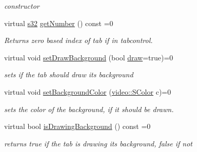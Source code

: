 \begin{DoxyCompactItemize}
\begin{DoxyCompactList}\small\item\em constructor \end{DoxyCompactList}\item 
virtual \hyperlink{namespaceirr_ac66849b7a6ed16e30ebede579f9b47c6}{s32} \hyperlink{classirr_1_1gui_1_1IGUITab_aedc76f9d93782188741ace78b32634f0}{get\+Number} () const =0
\begin{DoxyCompactList}\small\item\em Returns zero based index of tab if in tabcontrol. \end{DoxyCompactList}\item 
\mbox{\label{classirr_1_1gui_1_1IGUITab_a15aa82c853f4e72c1da37f556cd3b097}} 
virtual void \hyperlink{classirr_1_1gui_1_1IGUITab_a15aa82c853f4e72c1da37f556cd3b097}{set\+Draw\+Background} (bool \hyperlink{classirr_1_1gui_1_1IGUIElement_a1ef7eeaff67b8a9f4f37cacdc7e54be2}{draw}=true)=0
\begin{DoxyCompactList}\small\item\em sets if the tab should draw its background \end{DoxyCompactList}\item 
\mbox{\label{classirr_1_1gui_1_1IGUITab_aed83e8e69af7637cfd86380f6917a7de}} 
virtual void \hyperlink{classirr_1_1gui_1_1IGUITab_aed83e8e69af7637cfd86380f6917a7de}{set\+Background\+Color} (\hyperlink{classirr_1_1video_1_1SColor}{video\+::\+S\+Color} c)=0
\begin{DoxyCompactList}\small\item\em sets the color of the background, if it should be drawn. \end{DoxyCompactList}\item 
\mbox{\label{classirr_1_1gui_1_1IGUITab_ab357a99f63a7ecbd3da5adbc24f43e58}} 
virtual bool \hyperlink{classirr_1_1gui_1_1IGUITab_ab357a99f63a7ecbd3da5adbc24f43e58}{is\+Drawing\+Background} () const =0
\begin{DoxyCompactList}\small\item\em returns true if the tab is drawing its background, false if not \end{DoxyCompactList}\item 
\mbox{\label{classirr_1_1gui_1_1IGUITab_ab9c9bd6b40bf90482d429d9a87f7e06c}} 

\end{DoxyCompactItemize}
